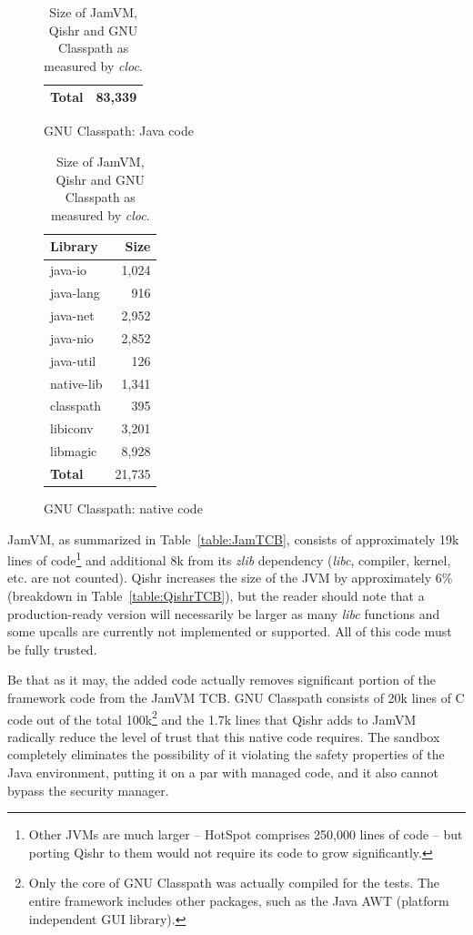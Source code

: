 \documentclass[a4paper,12pt,twoside,openright]{report}
\newcommand{\tool}[1]{\emph{#1}}
\newcommand{\lib}[1]{\tool{lib#1}}
\begin{document}
\begin{table}[h]
\begin{subfigure}{0.45\textwidth}
\begin{tabular}{|l|r|}
		\hline
		\bf Total		& 83,339		\\
		\hline
		\end{tabular}
		\caption{GNU Classpath: Java code}
	\end{subfigure}
	\begin{subfigure}{0.45\textwidth}
		\centering
		\footnotesize
		\begin{tabular}{|l|r|}
		\hline
		\bf Library		& \bf Size		\\
		\hline
		java-io		& 1,024				\\
		java-lang		& 916				\\
		java-net		& 2,952				\\
		java-nio		& 2,852				\\
		java-util		& 126				\\
		native-lib		& 1,341				\\
		classpath		& 395				\\
		libiconv		& 3,201				\\
		libmagic		& 8,928				\\
		\hline
		\bf Total		& 21,735				\\
		\hline
		\end{tabular}
		\caption{GNU Classpath: native code}
	\end{subfigure}
	\caption{Size of JamVM, Qishr and GNU Classpath as measured by \emph{cloc}.}
\end{table}

JamVM, as summarized in Table~\ref{table:JamTCB}, consists of approximately 19k lines of code\footnote{Other JVMs are much larger -- HotSpot comprises 250,000 lines of code -- but porting Qishr to them would not require its code to grow significantly.} and additional 8k from its \emph{zlib} dependency (\lib{c}, compiler, kernel, etc. are not counted). Qishr increases the size of the JVM by approximately 6\% (breakdown in Table~\ref{table:QishrTCB}), but the reader should note that a production-ready version will necessarily be larger as many \lib{c} functions and some upcalls are currently not implemented or supported. All of this code must be fully trusted.

Be that as it may, the added code actually removes significant portion of the framework code from the JamVM TCB. GNU Classpath consists of 20k lines of C code out of the total 100k\footnote{Only the core of GNU Classpath was actually compiled for the tests. The entire framework includes other packages, such as the Java AWT (platform independent GUI library).} and the 1.7k lines that Qishr adds to JamVM radically reduce the level of trust that this native code requires. The sandbox completely eliminates the possibility of it violating the safety properties of the Java environment, putting it on a par with managed code, and it also cannot bypass the security manager.
\end{document}
